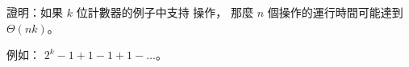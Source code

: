 \startEXERCISE
證明：如果 $k$ 位計數器的例子中支持  操作，
那麼 $n$ 個操作的運行時間可能達到 $\Theta(nk)$。
\stopEXERCISE

\startANSWER
例如： $2^k -1 + 1 -1 + 1 - \ldots$。
\stopANSWER
